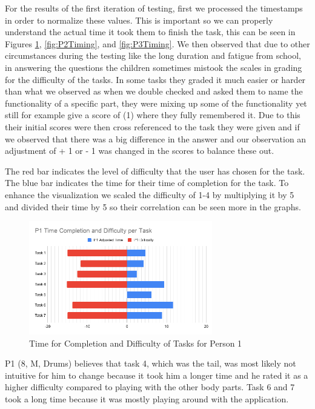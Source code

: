 For the results of the first iteration of testing, first we processed the timestamps in order to normalize these values. This is important so we can properly understand the actual time it took them to finish the task, this can be seen in Figures \ref{fig:P1Timing}, \ref{fig:P2Timing}, and \ref{fig:P3Timing}. We then observed that due to other circumstances during the testing like the long duration and fatigue from school, in answering the questions the children sometimes mistook the scales in grading for the difficulty of the tasks. In some tasks they graded it much easier or harder than what we observed as when we double checked and asked them to name the functionality of a specific part, they were mixing up some of the functionality yet still for example give a score of (1) where they fully remembered it. Due to this their initial scores were then cross referenced to the task they were given and if we observed that there was a big difference in the answer and our observation an adjustment of  + 1 or - 1 was changed in the scores to balance these out. 

The red bar indicates the level of difficulty that the user has chosen for the task. The blue bar indicates the time for their time of completion for the task. To enhance the visualization we scaled the difficulty of 1-4 by multiplying it by 5 and divided their time by 5 so their correlation can be seen more in the graphs.

\begin{figure}[H]
    \centering
    \includegraphics[width=8cm]{figures/NewFigures/P1.png}
    \caption{Time for Completion and Difficulty of Tasks for Person 1}
    \label{fig:P1Timing}
\end{figure}
 P1 (8, M, Drums) believes that task 4, which was the tail, was most likely not intuitive for him to change because it took him a longer time and he rated it as a higher difficulty compared to playing with the other body parts. Task 6 and 7 took a long time because it was mostly playing around with the application.
 
